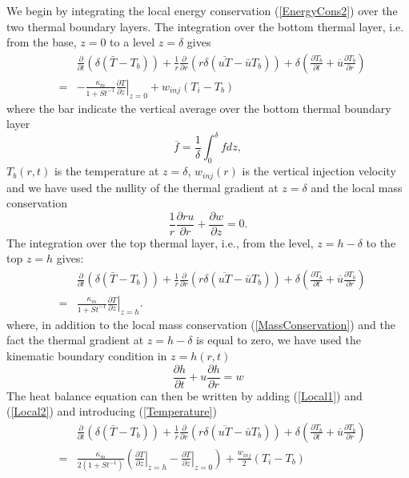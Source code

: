 We   begin    by   integrating    the   local    energy   conservation
(\ref{EnergyCons2})  over  the  two   thermal  boundary  layers.   The
integration over the  bottom thermal layer, i.e. from  the base, $z=0$
to a level $z = \delta$ gives
\begin{eqnarray}
  &&\frac{\partial}{\partial t}\left( \delta( \bar{T}-T_b)\right)+\frac{1}{r}\frac{\partial}{\partial r} \left( r\delta(\overline{uT}-\bar{u}T_b)\right) + \delta\left( \frac{\partial T_b}{\partial t}+ \overline{u}\frac{\partial T_b}{\partial r}\right)\nonumber\\
  &=&-\frac{\kappa_m}{1+St^{-1}}\left. \frac{\partial T}{\partial z}\right|_{z=0}+w_{inj}(T_{i}-T_b)
      \label{Local1}
\end{eqnarray}
where the  bar indicate the  vertical average over the  bottom thermal
boundary layer
\begin{equation}
  \overline{f} = \frac{1}{\delta}\int_0^{\delta}f dz\nonumber,
\end{equation}
$T_b(r,t)$  is  the temperature  at  $z=\delta$,  $w_{inj}(r)$ is  the
vertical  injection velocity  and  we  have used  the  nullity of  the
thermal gradient at $z=\delta$ and the local mass conservation
\begin{equation}
  \frac{1}{r}\frac{\partial ru}{\partial r} +\frac{\partial w}{\partial z}=0.
  \label{MassConservation}
\end{equation}
The  integration over  the top  thermal layer,  i.e., from  the level,
$z=h-\delta$ to the top $z=h$ gives:
\begin{eqnarray}
  &&\frac{\partial}{\partial t}\left( \delta( \bar{T}-T_b)\right)+\frac{1}{r}\frac{\partial}{\partial r} \left( r\delta(\overline{uT}-\bar{u}T_b)\right) + \delta\left(\frac{\partial T_b}{\partial t}+ \overline{u}\frac{\partial T_b}{\partial r}\right)\nonumber\\
  &=&\frac{\kappa_m}{1+St^{-1}}\left. \frac{\partial T}{\partial z}\right|_{z=h}.
      \label{Local2}
\end{eqnarray}
where,    in    addition    to    the    local    mass    conservation
(\ref{MassConservation})  and   the  fact  the  thermal   gradient  at
$z=h-\delta$ is  equal to  zero, we have  used the  kinematic boundary
condition in $z=h(r,t)$
\begin{equation}
  \frac{\partial h}{\partial t} +u\frac{\partial h}{\partial
    r} = w
\end{equation}
The heat balance equation can then be written by adding (\ref{Local1})
and (\ref{Local2}) and introducing (\ref{Temperature})
\begin{eqnarray}
  &&\frac{\partial}{\partial t}\left( \delta( \bar{T}-T_b)\right)+\frac{1}{r}\frac{\partial}{\partial r} \left( r\delta(\overline{uT}-\bar{u}T_b)\right) + \delta\left( \frac{\partial T_b}{\partial t}+ \overline{u}\frac{\partial T_b}{\partial r}\right)\nonumber\\
  &=&\frac{\kappa_m}{2(1+St^{-1})}\left(\left. \frac{\partial T}{\partial z}\right|_{z=h}-\left. \frac{\partial T}{\partial z}\right|_{z=0}\right)+\frac{w_{inj}}{2}(T_{i}-T_b)
      \label{LocalHeat3}
\end{eqnarray}

